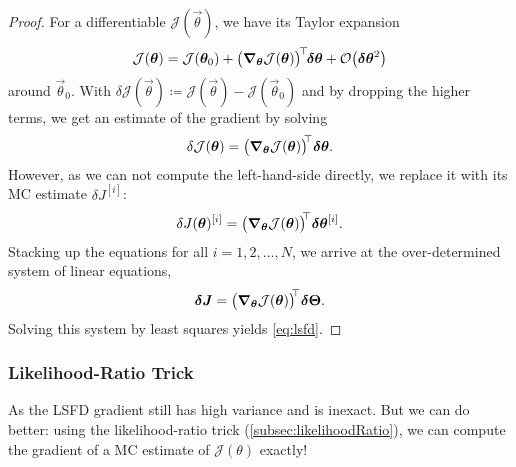 				\begin{proof}
					For a differentiable \(\mathcal{J}(\vec{\theta})\), we have its Taylor expansion
					\begin{equation}
						\mathcal{J}(\bm{\theta}) = \mathcal{J}(\bm{\theta}_0) + \bigl( \grad_{\bm{\theta}} \mathcal{J}(\bm{\theta}) \bigr)^{\!\top\!} \bm{\delta\theta} + \mathcal{O}\bigl( \bm{\delta\theta}^2 \bigr)
					\end{equation}
					around \(\vec{\theta}_0\). With \( \delta\mathcal{J}(\vec{\theta}) \coloneqq \mathcal{J}(\vec{\theta}) - \mathcal{J}(\vec{\theta}_0) \) and by dropping the higher terms, we get an estimate of the gradient by solving
					\begin{equation}
						\delta\mathcal{J}(\bm{\theta}) = \bigl( \grad_{\bm{\theta}}\mathcal{J}(\bm{\theta}) \bigr)^{\!{\!\top\!}\,} \bm{\delta\theta}.
					\end{equation}
					However, as we can not compute the left-hand-side directly, we replace it with its \ac{MC} estimate \( {\delta J}^{[i]} \):
					\begin{equation}
						{\delta J}(\bm{\theta})^{[i]} = \bigl( \grad_{\bm{\theta}}\mathcal{J}(\bm{\theta}) \bigr)^{\!{\!\top\!}\,} \bm{\delta\theta}^{[i]}.
					\end{equation}
					Stacking up the equations for all \( i = 1, 2, \dots, N \), we arrive at the over-determined system of linear equations,
					\begin{equation}
						\bm{\delta J} = \bigl( \grad_{\bm{\theta}}\mathcal{J}(\bm{\theta}) \bigr)^{\!{\!\top\!}\,} \bm{\mathrm{\delta\Theta}}.
					\end{equation}
					Solving this system by least squares yields \eqref{eq:lsfd}.
				\end{proof}

			\subsubsection{Likelihood-Ratio Trick}
				As the \ac{LSFD} gradient still has high variance and is inexact. But we can do better: using the likelihood-ratio trick (\autoref{subsec:likelihoodRatio}), we can compute the gradient of a \ac{MC} estimate of \(\mathcal{J}(\theta)\) exactly!

